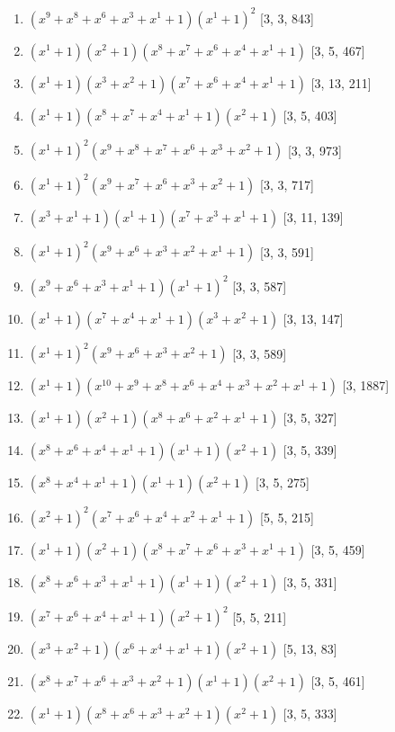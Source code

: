 \documentclass[10pt,twocolumn]{article}
\begin{document}
\begin{enumerate}
\item $(x^{9} + x^{8} + x^{6} + x^{3} + x^{1} + 1)(x^{1} + 1)^{2}$  [3, 3, 843]
\item $(x^{1} + 1)(x^{2} + 1)(x^{8} + x^{7} + x^{6} + x^{4} + x^{1} + 1)$  [3, 5, 467]
\item $(x^{1} + 1)(x^{3} + x^{2} + 1)(x^{7} + x^{6} + x^{4} + x^{1} + 1)$  [3, 13, 211]
\item $(x^{1} + 1)(x^{8} + x^{7} + x^{4} + x^{1} + 1)(x^{2} + 1)$  [3, 5, 403]
\item $(x^{1} + 1)^{2}(x^{9} + x^{8} + x^{7} + x^{6} + x^{3} + x^{2} + 1)$  [3, 3, 973]
\item $(x^{1} + 1)^{2}(x^{9} + x^{7} + x^{6} + x^{3} + x^{2} + 1)$  [3, 3, 717]
\item $(x^{3} + x^{1} + 1)(x^{1} + 1)(x^{7} + x^{3} + x^{1} + 1)$  [3, 11, 139]
\item $(x^{1} + 1)^{2}(x^{9} + x^{6} + x^{3} + x^{2} + x^{1} + 1)$  [3, 3, 591]
\item $(x^{9} + x^{6} + x^{3} + x^{1} + 1)(x^{1} + 1)^{2}$  [3, 3, 587]
\item $(x^{1} + 1)(x^{7} + x^{4} + x^{1} + 1)(x^{3} + x^{2} + 1)$  [3, 13, 147]
\item $(x^{1} + 1)^{2}(x^{9} + x^{6} + x^{3} + x^{2} + 1)$  [3, 3, 589]
\item $(x^{1} + 1)(x^{10} + x^{9} + x^{8} + x^{6} + x^{4} + x^{3} + x^{2} + x^{1} + 1)$  [3, 1887]
\item $(x^{1} + 1)(x^{2} + 1)(x^{8} + x^{6} + x^{2} + x^{1} + 1)$  [3, 5, 327]
\item $(x^{8} + x^{6} + x^{4} + x^{1} + 1)(x^{1} + 1)(x^{2} + 1)$  [3, 5, 339]
\item $(x^{8} + x^{4} + x^{1} + 1)(x^{1} + 1)(x^{2} + 1)$  [3, 5, 275]
\item $(x^{2} + 1)^{2}(x^{7} + x^{6} + x^{4} + x^{2} + x^{1} + 1)$  [5, 5, 215]
\item $(x^{1} + 1)(x^{2} + 1)(x^{8} + x^{7} + x^{6} + x^{3} + x^{1} + 1)$  [3, 5, 459]
\item $(x^{8} + x^{6} + x^{3} + x^{1} + 1)(x^{1} + 1)(x^{2} + 1)$  [3, 5, 331]
\item $(x^{7} + x^{6} + x^{4} + x^{1} + 1)(x^{2} + 1)^{2}$  [5, 5, 211]
\item $(x^{3} + x^{2} + 1)(x^{6} + x^{4} + x^{1} + 1)(x^{2} + 1)$  [5, 13, 83]
\item $(x^{8} + x^{7} + x^{6} + x^{3} + x^{2} + 1)(x^{1} + 1)(x^{2} + 1)$  [3, 5, 461]
\item $(x^{1} + 1)(x^{8} + x^{6} + x^{3} + x^{2} + 1)(x^{2} + 1)$  [3, 5, 333]

\end{enumerate}
\end{document}

